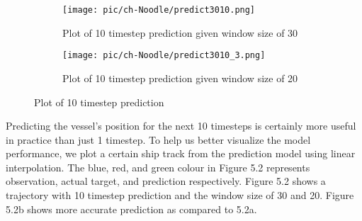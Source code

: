 \begin{table}[t!]
\centering
\caption{Model performance with dynamic window size and 10 prediction timestep}
\label{tab:target10}
\end{table}

\begin{figure}[t!]
\centering
\begin{subfigure}[b]{0.45\textwidth}
  \centering
  \texttt{[image: pic/ch-Noodle/predict3010.png]}
  \caption{Plot of 10 timestep prediction given window size of 30}
  \label{fig:predict3010}
\end{subfigure}
%
\begin{subfigure}[b]{0.5\textwidth}
  \centering
  \texttt{[image: pic/ch-Noodle/predict3010\_3.png]}
  \caption{Plot of 10 timestep prediction given window size of 20}
  \label{fig:predict2010}
\end{subfigure}
\caption{Plot of 10 timestep prediction}
\label{fig:predict10}
\end{figure}

Predicting the vessel's position for the next 10 timesteps is certainly more useful in practice than just 1 timestep. To help us better visualize the model performance, we plot a certain ship track from the prediction model using linear interpolation. The blue, red, and green colour in Figure 5.2 represents observation, actual target, and prediction respectively. Figure 5.2 shows a trajectory with 10 timestep prediction and the window size of 30 and 20. Figure 5.2b shows more accurate prediction as compared to 5.2a.

